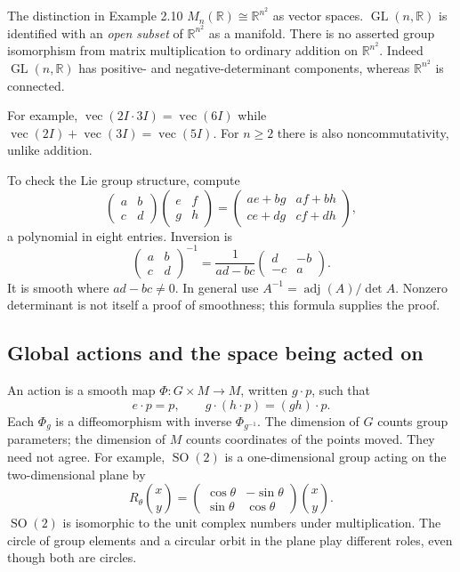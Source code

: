 \documentclass[11pt,a4paper]{article}
\numberwithin{equation}{section}
\theoremstyle{definition}
\theoremstyle{plain}
\theoremstyle{remark}
\newcommand{\R}{\mathbb R}
\newcommand{\g}{\mathfrak g}
\newcommand{\GL}{\operatorname{GL}}
\newcommand{\SO}{\operatorname{SO}}
\begin{document}
\begin{correction}{The distinction in Example 2.10}
$M_n(\R)\cong\R^{n^2}$ as vector spaces. $\GL(n,\R)$ is identified with an \emph{open subset} of $\R^{n^2}$ as a manifold. There is no asserted group isomorphism from matrix multiplication to ordinary addition on $\R^{n^2}$. Indeed $\GL(n,\R)$ has positive- and negative-determinant components, whereas $\R^{n^2}$ is connected.
\end{correction}
For example, $\operatorname{vec}(2I\cdot3I)=\operatorname{vec}(6I)$ while $\operatorname{vec}(2I)+\operatorname{vec}(3I)=\operatorname{vec}(5I)$. For $n\ge2$ there is also noncommutativity, unlike addition.

To check the Lie group structure, compute
\[
\begin{pmatrix}a&b\\c&d\end{pmatrix}
\begin{pmatrix}e&f\\g&h\end{pmatrix}
=\begin{pmatrix}ae+bg&af+bh\\ce+dg&cf+dh\end{pmatrix},
\]
a polynomial in eight entries. Inversion is
\[
\begin{pmatrix}a&b\\c&d\end{pmatrix}^{-1}
=\frac1{ad-bc}\begin{pmatrix}d&-b\\-c&a\end{pmatrix}.
\]
It is smooth where $ad-bc\ne0$. In general use $A^{-1}=\operatorname{adj}(A)/\det A$. Nonzero determinant is not itself a proof of smoothness; this formula supplies the proof.

\subsection{Global actions and the space being acted on}
An action is a smooth map $\Phi:G\times M\to M$, written $g\cdot p$, such that
\[
e\cdot p=p,\qquad g\cdot(h\cdot p)=(gh)\cdot p.
\]
Each $\Phi_g$ is a diffeomorphism with inverse $\Phi_{g^{-1}}$. The dimension of $G$ counts group parameters; the dimension of $M$ counts coordinates of the points moved. They need not agree.
For example, $\SO(2)$ is a one-dimensional group acting on the two-dimensional plane by
\[
R_\theta\binom{x}{y}=
\begin{pmatrix}\cos\theta&-\sin\theta\\\sin\theta&\cos\theta\end{pmatrix}\binom{x}{y}.
\]
$\SO(2)$ is isomorphic to the unit complex numbers under multiplication. The circle of group elements and a circular orbit in the plane play different roles, even though both are circles.
\end{document}
